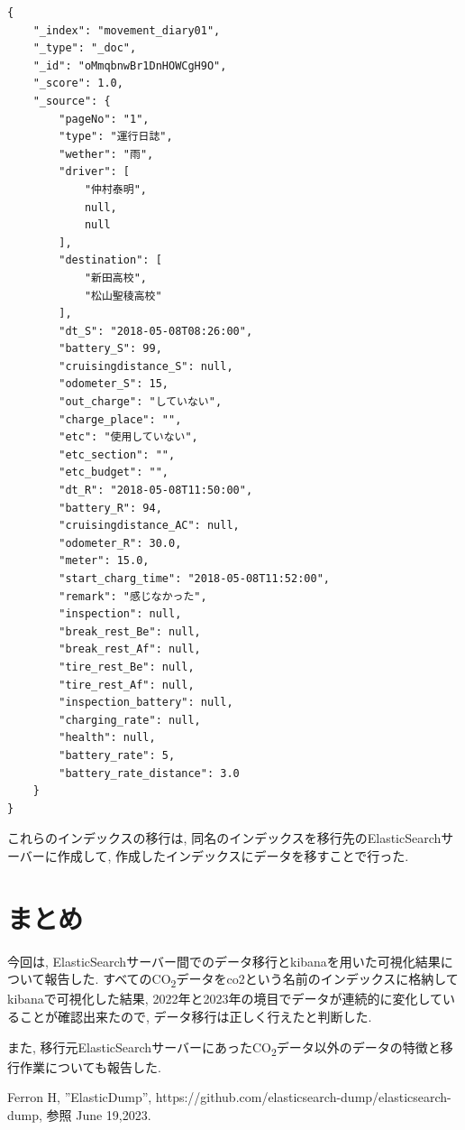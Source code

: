 \documentclass[a4j,12pt,]{jarticle}
\begin{document}
\begin{lstlisting}[caption=movement\_diary01のドキュメントデータ, label=sc1]
  {
    "_index": "movement_diary01",
    "_type": "_doc",
    "_id": "oMmqbnwBr1DnHOWCgH9O",
    "_score": 1.0,
    "_source": {
        "pageNo": "1",
        "type": "運行日誌",
        "wether": "雨",
        "driver": [
            "仲村泰明",
            null,
            null
        ],
        "destination": [
            "新田高校",
            "松山聖稜高校"
        ],
        "dt_S": "2018-05-08T08:26:00",
        "battery_S": 99,
        "cruisingdistance_S": null,
        "odometer_S": 15,
        "out_charge": "していない",
        "charge_place": "",
        "etc": "使用していない",
        "etc_section": "",
        "etc_budget": "",
        "dt_R": "2018-05-08T11:50:00",
        "battery_R": 94,
        "cruisingdistance_AC": null,
        "odometer_R": 30.0,
        "meter": 15.0,
        "start_charg_time": "2018-05-08T11:52:00",
        "remark": "感じなかった",
        "inspection": null,
        "break_rest_Be": null,
        "break_rest_Af": null,
        "tire_rest_Be": null,
        "tire_rest_Af": null,
        "inspection_battery": null,
        "charging_rate": null,
        "health": null,
        "battery_rate": 5,
        "battery_rate_distance": 3.0
    }
}
\end{lstlisting}

これらのインデックスの移行は, 同名のインデックスを移行先のElasticSearchサーバーに作成して, 作成したインデックスにデータを移すことで行った.

\section{まとめ}
今回は, ElasticSearchサーバー間でのデータ移行とkibanaを用いた可視化結果について報告した.
すべてのCO\textsubscript{2}データをco2という名前のインデックスに格納してkibanaで可視化した結果, 2022年と2023年の境目でデータが連続的に変化していることが確認出来たので, データ移行は正しく行えたと判断した.

また, 移行元ElasticSearchサーバーにあったCO\textsubscript{2}データ以外のデータの特徴と移行作業についても報告した.

\begin{thebibliography}{5}
  Ferron H, ”ElasticDump”, https://github.com/elasticsearch-dump/elasticsearch-dump, 参照 June 19,2023.
\end{thebibliography}
\end{document}
